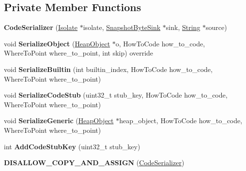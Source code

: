 \subsection*{Private Member Functions}
\begin{DoxyCompactItemize}
\item 
{\bfseries Code\+Serializer} (\hyperlink{classv8_1_1internal_1_1_isolate}{Isolate} $\ast$isolate, \hyperlink{classv8_1_1internal_1_1_snapshot_byte_sink}{Snapshot\+Byte\+Sink} $\ast$sink, \hyperlink{classv8_1_1internal_1_1_string}{String} $\ast$source)\hypertarget{classv8_1_1internal_1_1_code_serializer_a2fd176322fe454f1a88e7e145fa96cbb}{}\label{classv8_1_1internal_1_1_code_serializer_a2fd176322fe454f1a88e7e145fa96cbb}

\item 
void {\bfseries Serialize\+Object} (\hyperlink{classv8_1_1internal_1_1_heap_object}{Heap\+Object} $\ast$o, How\+To\+Code how\+\_\+to\+\_\+code, Where\+To\+Point where\+\_\+to\+\_\+point, int skip) override\hypertarget{classv8_1_1internal_1_1_code_serializer_ab47402422d2c5e4cac2825025b1f1a45}{}\label{classv8_1_1internal_1_1_code_serializer_ab47402422d2c5e4cac2825025b1f1a45}

\item 
void {\bfseries Serialize\+Builtin} (int builtin\+\_\+index, How\+To\+Code how\+\_\+to\+\_\+code, Where\+To\+Point where\+\_\+to\+\_\+point)\hypertarget{classv8_1_1internal_1_1_code_serializer_ad129844b58a4603e781994aa2edc0c69}{}\label{classv8_1_1internal_1_1_code_serializer_ad129844b58a4603e781994aa2edc0c69}

\item 
void {\bfseries Serialize\+Code\+Stub} (uint32\+\_\+t stub\+\_\+key, How\+To\+Code how\+\_\+to\+\_\+code, Where\+To\+Point where\+\_\+to\+\_\+point)\hypertarget{classv8_1_1internal_1_1_code_serializer_a63ac1205150770ffee7e0d7a17e6609f}{}\label{classv8_1_1internal_1_1_code_serializer_a63ac1205150770ffee7e0d7a17e6609f}

\item 
void {\bfseries Serialize\+Generic} (\hyperlink{classv8_1_1internal_1_1_heap_object}{Heap\+Object} $\ast$heap\+\_\+object, How\+To\+Code how\+\_\+to\+\_\+code, Where\+To\+Point where\+\_\+to\+\_\+point)\hypertarget{classv8_1_1internal_1_1_code_serializer_a3d70ea8cd3a78014ded230ab81153637}{}\label{classv8_1_1internal_1_1_code_serializer_a3d70ea8cd3a78014ded230ab81153637}

\item 
int {\bfseries Add\+Code\+Stub\+Key} (uint32\+\_\+t stub\+\_\+key)\hypertarget{classv8_1_1internal_1_1_code_serializer_a9fc99df4c3918491f0c3e5bc5930e0eb}{}\label{classv8_1_1internal_1_1_code_serializer_a9fc99df4c3918491f0c3e5bc5930e0eb}

\item 
{\bfseries D\+I\+S\+A\+L\+L\+O\+W\+\_\+\+C\+O\+P\+Y\+\_\+\+A\+N\+D\+\_\+\+A\+S\+S\+I\+GN} (\hyperlink{classv8_1_1internal_1_1_code_serializer}{Code\+Serializer})\hypertarget{classv8_1_1internal_1_1_code_serializer_aea9ed7520e0682265f368e899b412373}{}\label{classv8_1_1internal_1_1_code_serializer_aea9ed7520e0682265f368e899b412373}

\end{DoxyCompactItemize}
